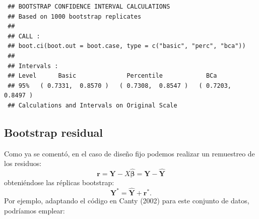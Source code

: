 \documentclass[
  spanish,
  10pt,
]{book}
\newenvironment{Shaded}{\begin{snugshade}}{\end{snugshade}}
\newcommand{\AttributeTok}[1]{\textcolor[rgb]{0.13,0.29,0.53}{#1}}
\newcommand{\ControlFlowTok}[1]{\textcolor[rgb]{0.13,0.29,0.53}{\textbf{#1}}}
\newcommand{\DecValTok}[1]{\textcolor[rgb]{0.00,0.00,0.81}{#1}}
\newcommand{\FunctionTok}[1]{\textcolor[rgb]{0.13,0.29,0.53}{\textbf{#1}}}
\newcommand{\NormalTok}[1]{#1}
\newcommand{\OtherTok}[1]{\textcolor[rgb]{0.56,0.35,0.01}{#1}}
\newcommand{\SpecialCharTok}[1]{\textcolor[rgb]{0.81,0.36,0.00}{\textbf{#1}}}
\renewcommand{\mathbf}[1]{\symbf{#1}}
\theoremstyle{break}
\theoremstyle{nonumberplain}
\begin{document}
\begin{verbatim}
 ## BOOTSTRAP CONFIDENCE INTERVAL CALCULATIONS
 ## Based on 1000 bootstrap replicates
 ## 
 ## CALL : 
 ## boot.ci(boot.out = boot.case, type = c("basic", "perc", "bca"))
 ## 
 ## Intervals : 
 ## Level      Basic              Percentile            BCa          
 ## 95%   ( 0.7331,  0.8570 )   ( 0.7308,  0.8547 )   ( 0.7203,  0.8497 )  
 ## Calculations and Intervals on Original Scale
\end{verbatim}

\subsection{Bootstrap residual}\label{boot-residual}

Como ya se comentó, en el caso de diseño fijo podemos realizar un remuestreo de los residuos:
\[\mathbf{r} = \mathbf{Y} - X\hat{\mathbf{\beta}} = \mathbf{Y} - \hat{\mathbf{Y}}\]
obteniéndose las réplicas bootstrap:
\[\mathbf{Y}^{\ast} = \hat{\mathbf{Y}} + \mathbf{r}^{\ast}.\]
Por ejemplo, adaptando el código en Canty (2002) para este conjunto de datos, podríamos emplear:

\begin{Shaded}
\end{Shaded}
\end{document}
